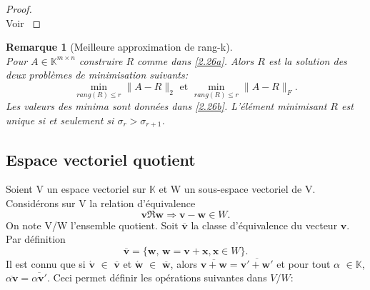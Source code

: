 \documentclass[11pt,a4paper,oneside]{book}
\newtheorem{prop}{Proposition}[chapter]
\newtheorem{rem}{Remarque}[chapter]
\newtheorem{proof}{Démonstration}
\def\K{\mathbb K}
\def\v{\mathbf v}
\def\x{\mathbf x}
\def\w{\mathbf w}
\begin{document}
\begin{proof}
\emph{\\} Voir \cite[p.35]{hackbusch2012tensor}
\end{proof}
\begin{rem}[Meilleure approximation de rang-{\normalfont k}]
\emph{\\}Pour $ A\in\K^{m\times n} $ construire $ R $ comme dans \eqref{2.26a}. Alors $ R $ est la solution des deux problèmes de minimisation suivants:
\begin{equation}
\underset{rang(R)\leq r}{\min}\parallel A-R\parallel_{2}\text{ et }\underset{rang(R)\leq r}{\min}\parallel A-R\parallel_{F}. 
\end{equation}
Les valeurs des minima sont données dans \eqref{2.26b}. L'élément minimisant $ R $ est unique si et seulement si $ \sigma_{r} > \sigma_{r+1} $.
\end{rem}
%
% 

\subsection{Espace vectoriel quotient}
 Soient V un espace vectoriel sur $ \K $ et W un sous-espace vectoriel de V. Considérons sur V la relation
d'équivalence
$$\v\Re \w\Rightarrow \v-\w\in W. $$
On note V/W l'ensemble quotient. Soit $ \overline{\v} $ la classe d'équivalence du vecteur $ \v $. Par définition
$$\overline{\v} = \{\w,\, \w=\v+\x,\x\in W\}.$$ Il est connu que si
$\acute{\v}$ $ \in $ $\overline{\v} $ et $\acute{\w}$ $ \in $ $\overline{\w} $, alors $ \overline{\v+\w} =\overline{\v'+\w'}$ et pour tout $\alpha$ $\in$$ \K $, $ \overline{\alpha \v}=\overline{\alpha \v'}. $
Ceci permet définir les opérations suivantes dans $ V/W$:
\end{document}
